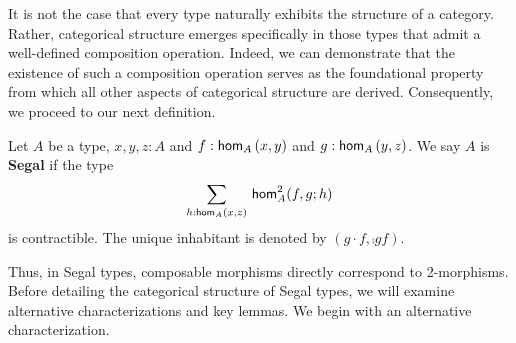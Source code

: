 \documentclass[main.tex]{subfiles}
\begin{document}
It is not the case that every type naturally exhibits the structure of a category. Rather, categorical structure emerges specifically in those types that admit a well-defined composition operation. Indeed, we can demonstrate that the existence of such a composition operation serves as the foundational property from which all other aspects of categorical structure are derived. Consequently, we proceed to our next definition.
\begin{definition}
    \label{def:def3.3}
    Let $A$ be a type, $x,y,z : A$ and $f : \ho[A]{x}{y}$ and $g : \ho[A]{y}{z}$. We say $A$ is \textbf{Segal} if the type $${\sm{h : \ho[A]{x}{z}} \hot[A]{f}{g}{h}} $$
    is contractible. The unique inhabitant is denoted by $(g\cdot f, \comp{g}{f}).$
\end{definition}

Thus, in Segal types, composable morphisms directly correspond to 2-mor{\linebreak}phisms. Before detailing the categorical structure of Segal types, we will examine alternative characterizations and key lemmas. We begin with an alternative characterization.
\end{document}
